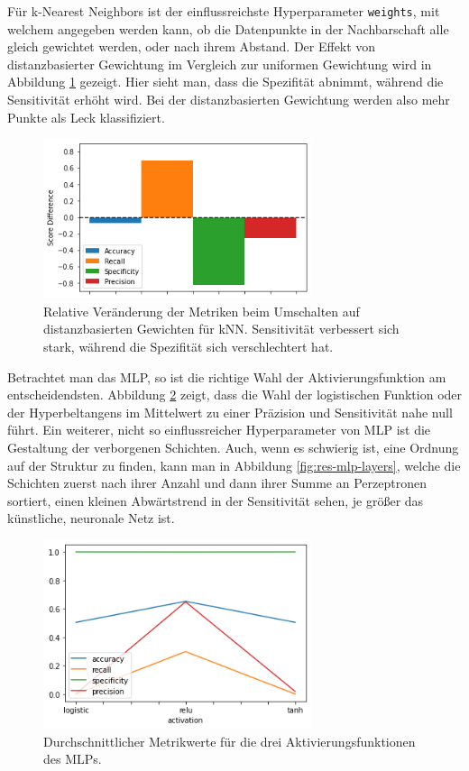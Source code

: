 Für k-Nearest Neighbors ist der einflussreichste Hyperparameter \texttt{weights}, mit welchem angegeben werden
 kann, ob die Datenpunkte in der Nachbarschaft alle gleich gewichtet werden, oder nach ihrem Abstand. Der Effekt
 von distanzbasierter Gewichtung im Vergleich zur uniformen Gewichtung wird in Abbildung
 \ref{fig:res-knn-weights} gezeigt. Hier sieht man, dass die Spezifität abnimmt, während die Sensitivität
 erhöht wird. Bei der distanzbasierten Gewichtung werden also mehr Punkte als Leck klassifiziert.

\begin{figure}
    \centering
    \includegraphics[width=0.7\textwidth]{res/res-knn-weights}
    \caption{Relative Veränderung der Metriken beim Umschalten auf distanzbasierten Gewichten für kNN.
        Sensitivität verbessert sich stark, während die Spezifität sich verschlechtert hat.}
    \label{fig:res-knn-weights}
\end{figure}

Betrachtet man das MLP, so ist die richtige Wahl der Aktivierungsfunktion am entscheidendsten. Abbildung
 \ref{fig:res-mlp-activation} zeigt, dass die Wahl der logistischen Funktion oder der Hyperbeltangens im
 Mittelwert zu einer Präzision und Sensitivität nahe null führt. Ein weiterer, nicht so einflussreicher
 Hyperparameter von MLP ist die Gestaltung der verborgenen Schichten. Auch, wenn es schwierig ist, eine Ordnung
 auf der Struktur zu finden, kann man in Abbildung \ref{fig:res-mlp-layers}, welche die Schichten zuerst nach
 ihrer Anzahl und dann ihrer Summe an Perzeptronen sortiert, einen kleinen Abwärtstrend in der Sensitivität
 sehen, je größer das künstliche, neuronale Netz ist.

\begin{figure}
    \centering
    \includegraphics[width=0.7\textwidth]{res/res-mlp-activation}
    \caption{Durchschnittlicher Metrikwerte für die drei Aktivierungsfunktionen des MLPs.}
    \label{fig:res-mlp-activation}
\end{figure}


